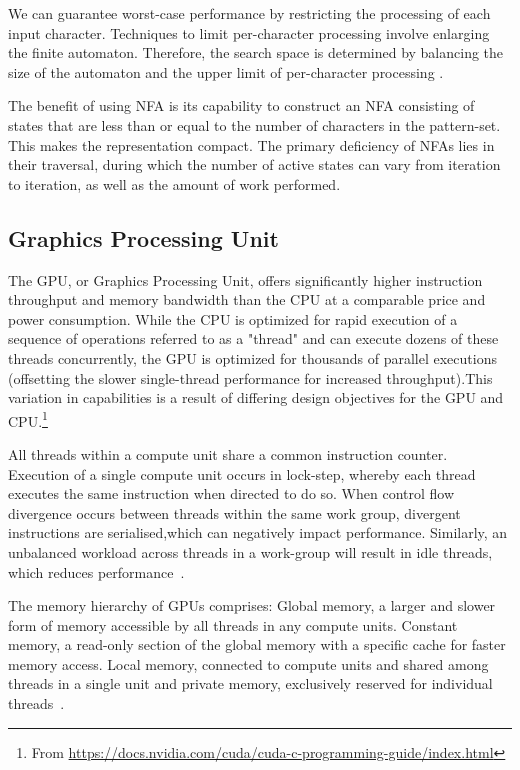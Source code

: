 \documentclass[10pt,onecolumn,twoside,english,a4paper]{article}
\begin{document}
We can guarantee worst-case performance by restricting the processing of each input character. Techniques to limit per-character processing involve enlarging the finite automaton. Therefore, the search space is determined by balancing the size of the automaton and the upper limit of per-character processing \cite{Nourian:DemystifyingFSA}.

The benefit of using NFA is its capability to construct an NFA consisting of states that are less than or equal to the number of characters in the pattern-set. This makes the representation compact. The primary deficiency of NFAs lies in their traversal, during which the number of active states can vary from iteration to iteration, as well as the amount of work performed\cite{Becchi:regex_large_dataset}.

\subsection{Graphics Processing Unit} \label{GPU}
The GPU, or Graphics Processing Unit, offers significantly higher instruction throughput and memory bandwidth than the CPU at a comparable price and power consumption.
While the CPU is optimized for rapid execution of a sequence of operations referred to as a "thread" and can execute dozens of these threads concurrently, the GPU is optimized for thousands of parallel executions (offsetting the slower single-thread performance for increased throughput).This variation in capabilities is a result of differing design objectives for the GPU and CPU.\footnote{From \url{https://docs.nvidia.com/cuda/cuda-c-programming-guide/index.html}}

All threads within a compute unit share a common instruction counter. Execution of a single compute unit occurs in lock-step, whereby each thread executes the same instruction when directed to do so. When control flow divergence occurs between threads within the same work group, divergent instructions are serialised,which can negatively impact performance.
Similarly, an unbalanced workload across threads in a work-group will result in idle threads, which reduces performance~\cite{yaneva2022gpuaccelerationFSA}.

The memory hierarchy of GPUs comprises: Global memory, a larger and slower form of memory accessible by all threads in any compute units. Constant memory, a read-only section of the global memory with a specific cache for faster memory access. Local memory, connected to compute units and shared among threads in a single unit and private memory, exclusively reserved for individual threads~\cite{yaneva2022gpuaccelerationFSA}.
\end{document}
